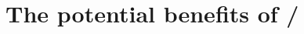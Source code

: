 \documentclass[../main.tex]{subfiles}
\begin{document}
    \section{The potential benefits of \FVA/}
        
\end{document}

